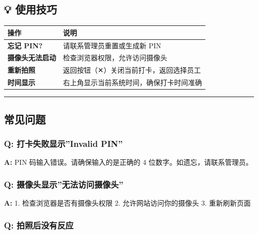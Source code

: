 \documentclass[
]{article}
\newcounter{none} %
\begin{document}
\subsection{💡 使用技巧}\label{ux4f7fux7528ux6280ux5de7}

{\def\LTcaptype{none} %
\begin{longtable}[]{@{}ll@{}}
\toprule\noalign{}
操作 & 说明 \\
\midrule\noalign{}
\endhead
\bottomrule\noalign{}
\endlastfoot
\textbf{忘记 PIN?} & 请联系管理员重置或生成新 PIN \\
\textbf{摄像头无法启动} & 检查浏览器权限，允许访问摄像头 \\
\textbf{重新拍照} & 返回按钮（✕）关闭当前打卡，返回选择员工 \\
\textbf{时间显示} & 右上角显示当前系统时间，确保打卡时间准确 \\
\end{longtable}
}

\begin{center}\rule{0.5\linewidth}{0.5pt}\end{center}

\subsection{常见问题}\label{ux5e38ux89c1ux95eeux9898}

\subsubsection{Q: 打卡失败显示''Invalid
PIN''}\label{q-ux6253ux5361ux5931ux8d25ux663eux793ainvalid-pin}

\textbf{A:} PIN 码输入错误。请确保输入的是正确的 4
位数字。如遗忘，请联系管理员。

\subsubsection{Q:
摄像头显示''无法访问摄像头''}\label{q-ux6444ux50cfux5934ux663eux793aux65e0ux6cd5ux8bbfux95eeux6444ux50cfux5934}

\textbf{A:} 1. 检查浏览器是否有摄像头权限 2. 允许网站访问你的摄像头 3.
重新刷新页面

\subsubsection{Q:
拍照后没有反应}\label{q-ux62cdux7167ux540eux6ca1ux6709ux53cdux5e94}
\end{document}
